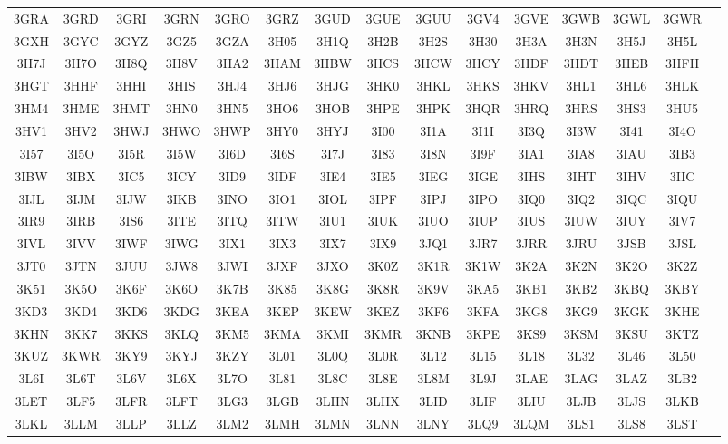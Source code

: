 \begin{longtable}{ c c c c c c c c c c c c c c c }
	3GRA & 3GRD & 3GRI & 3GRN & 3GRO & 3GRZ & 3GUD & 3GUE & 3GUU & 3GV4 & 3GVE & 3GWB & 3GWL & 3GWR  \\
	3GXH & 3GYC & 3GYZ & 3GZ5 & 3GZA & 3H05 & 3H1Q & 3H2B & 3H2S & 3H30 & 3H3A & 3H3N & 3H5J & 3H5L  \\
	3H7J & 3H7O & 3H8Q & 3H8V & 3HA2 & 3HAM & 3HBW & 3HCS & 3HCW & 3HCY & 3HDF & 3HDT & 3HEB & 3HFH  \\
	3HGT & 3HHF & 3HHI & 3HIS & 3HJ4 & 3HJ6 & 3HJG & 3HK0 & 3HKL & 3HKS & 3HKV & 3HL1 & 3HL6 & 3HLK  \\
	3HM4 & 3HME & 3HMT & 3HN0 & 3HN5 & 3HO6 & 3HOB & 3HPE & 3HPK & 3HQR & 3HRQ & 3HRS & 3HS3 & 3HU5  \\
	3HV1 & 3HV2 & 3HWJ & 3HWO & 3HWP & 3HY0 & 3HYJ & 3I00 & 3I1A & 3I1I & 3I3Q & 3I3W & 3I41 & 3I4O  \\
	3I57 & 3I5O & 3I5R & 3I5W & 3I6D & 3I6S & 3I7J & 3I83 & 3I8N & 3I9F & 3IA1 & 3IA8 & 3IAU & 3IB3  \\
	3IBW & 3IBX & 3IC5 & 3ICY & 3ID9 & 3IDF & 3IE4 & 3IE5 & 3IEG & 3IGE & 3IHS & 3IHT & 3IHV & 3IIC  \\
	3IJL & 3IJM & 3IJW & 3IKB & 3INO & 3IO1 & 3IOL & 3IPF & 3IPJ & 3IPO & 3IQ0 & 3IQ2 & 3IQC & 3IQU  \\
	3IR9 & 3IRB & 3IS6 & 3ITE & 3ITQ & 3ITW & 3IU1 & 3IUK & 3IUO & 3IUP & 3IUS & 3IUW & 3IUY & 3IV7  \\
	3IVL & 3IVV & 3IWF & 3IWG & 3IX1 & 3IX3 & 3IX7 & 3IX9 & 3JQ1 & 3JR7 & 3JRR & 3JRU & 3JSB & 3JSL  \\
	3JT0 & 3JTN & 3JUU & 3JW8 & 3JWI & 3JXF & 3JXO & 3K0Z & 3K1R & 3K1W & 3K2A & 3K2N & 3K2O & 3K2Z  \\
	3K51 & 3K5O & 3K6F & 3K6O & 3K7B & 3K85 & 3K8G & 3K8R & 3K9V & 3KA5 & 3KB1 & 3KB2 & 3KBQ & 3KBY  \\
	3KD3 & 3KD4 & 3KD6 & 3KDG & 3KEA & 3KEP & 3KEW & 3KEZ & 3KF6 & 3KFA & 3KG8 & 3KG9 & 3KGK & 3KHE  \\
	3KHN & 3KK7 & 3KKS & 3KLQ & 3KM5 & 3KMA & 3KMI & 3KMR & 3KNB & 3KPE & 3KS9 & 3KSM & 3KSU & 3KTZ  \\
	3KUZ & 3KWR & 3KY9 & 3KYJ & 3KZY & 3L01 & 3L0Q & 3L0R & 3L12 & 3L15 & 3L18 & 3L32 & 3L46 & 3L50  \\
	3L6I & 3L6T & 3L6V & 3L6X & 3L7O & 3L81 & 3L8C & 3L8E & 3L8M & 3L9J & 3LAE & 3LAG & 3LAZ & 3LB2  \\
	3LET & 3LF5 & 3LFR & 3LFT & 3LG3 & 3LGB & 3LHN & 3LHX & 3LID & 3LIF & 3LIU & 3LJB & 3LJS & 3LKB  \\
	3LKL & 3LLM & 3LLP & 3LLZ & 3LM2 & 3LMH & 3LMN & 3LNN & 3LNY & 3LQ9 & 3LQM & 3LS1 & 3LS8 & 3LST  \\

\end{longtable}
